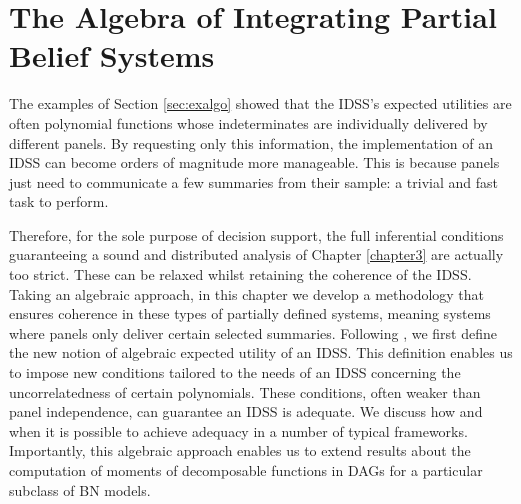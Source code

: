 
\chapter{The Algebra of Integrating Partial Belief Systems} %

\label{chapter5} %



The examples of Section \ref{sec:exalgo} showed that the IDSS's expected utilities are often polynomial functions whose indeterminates are individually delivered by different panels. By requesting only this information, the implementation of an IDSS can become orders of magnitude more manageable. This is because panels just need to communicate a few summaries from their sample: a trivial and fast task to perform. 

Therefore, for the sole purpose of decision support, the full inferential conditions guaranteeing a sound and distributed analysis of Chapter \ref{chapter3} are actually too strict. These can be relaxed whilst retaining the coherence of the IDSS. Taking an algebraic approach, in this chapter we develop  a methodology that ensures coherence in these types of partially defined systems, meaning systems where panels only deliver certain selected summaries. Following \citet{Leonelli2015b}, we first define the new notion of algebraic expected utility of an IDSS. This definition enables us to impose new conditions tailored to the needs of an IDSS concerning the uncorrelatedness of certain polynomials. These conditions, often weaker than panel independence, can guarantee an IDSS is adequate. We discuss how and when it is possible to achieve adequacy in a number of typical frameworks. Importantly, this algebraic approach enables us to extend results about the computation of moments of decomposable functions in DAGs \citep{Cowell1999a, Nilsson2001} for a particular subclass of BN models.  

